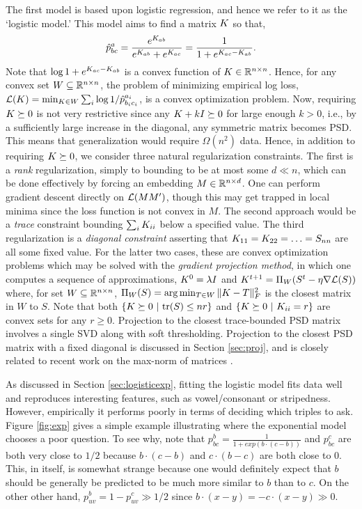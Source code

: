 \documentclass{article}
\begin{document}
The first model is based upon logistic regression, and hence we refer to it as the `logistic model.'  This model aims to find a matrix $\S$ so that,
\begin{equation}\label{eq:logistic}
\hat{p}^a_{bc} = \frac{e^{\S_{ab}}}{e^{\S_{ab}}+e^{\S_{ac}}} = \frac{1}{1+e^{\S_{ac}-\S_{ab}}}.
\end{equation}
Note that $\log 1+e^{\S_{ac}-\S_{ab}}$ is a convex function of $\S\in \reals^{n\times n}$.  Hence, for any convex set $W \subseteq \reals^{n \times n}$, the problem of minimizing empirical log loss, $\cL(\S)=\min_{\S \in W} \sum_i \log 1/\hp^{a_i}_{b_ic_i}$, is a convex optimization problem.  Now, requiring $\S \succeq 0$ is not very restrictive since any $\S+kI \succeq 0$ for large enough $k>0$, i.e., by a sufficiently large increase in the diagonal, any symmetric matrix becomes PSD. This means that generalization would require $\Omega(n^2)$ data.  Hence, in addition to requiring $\S \succeq 0$, we consider three natural regularization constraints.  The first is a {\em rank} regularization, simply to bounding to be at most some $d\ll n$, which can be done effectively by forcing an embedding $M \in \reals^{n \times d}$.  One can perform gradient descent directly on $\cL(MM')$, though this may get trapped in local minima since the loss function is not convex in $M$.  The second approach would be a {\em trace} constraint bounding $\sum_i \S_{ii}$ below a specified value. The third regularization is a {\em diagonal constraint} asserting that $\S_{11}=\S_{22}=\ldots=S_{nn}$ are all some fixed value.  For the latter two cases, these are convex optimization problems which may be solved with the {\em gradient projection method}, in which one computes a sequence of approximations, $\S^0=\lambda I$ and $\S^{t+1}= \Pi_W(S^t - \eta \nabla \cL(S))$ where, for set $W \subseteq \reals^{n \times n}$, $\Pi_W(S)=\arg\min_{T \in W} \|\S-T\|_F^2$ is the closest matrix in $W$ to $S$.  Note that both $\{\S \succeq 0~|~\tr(S)\leq nr\}$ and $\{\S \succeq 0~|~\S_{ii}=r\}$ are convex sets for any $r\geq 0$.  Projection to the closest trace-bounded PSD matrix involves a single SVD along with soft thresholding.  Projection to the closest PSD matrix with a fixed diagonal is discussed in Section \ref{sec:proj}, and is closely related to recent work on the max-norm of matrices \cite{SS05,??}.

As discussed in Section \ref{sec:logisticexp}, fitting the logistic model fits data well and reproduces interesting features, such as vowel/consonant or stripedness.  However, empirically it performs poorly in terms of deciding which triples to ask.  Figure \ref{fig:exp} gives a simple example illustrating where the exponential model chooses a poor question.  To see why, note that $p^{b}_{bc}=\frac{1}{1+exp(b\cdot(c-b))}$ and $p^{c}_{bc}$ are both very close to $1/2$ because $b\cdot (c-b)$ and $c \cdot (b-c)$ are both close to 0.  This, in itself, is somewhat strange because one would definitely expect that $b$ should be generally be predicted to be much more similar to $b$ than to $c$.  On the other other hand, $p^{b}_{uv}=1-p^{c}_{uv} \gg 1/2$ since $b\cdot (x-y)=-c \cdot (x-y)\gg 0$.
\end{document}

